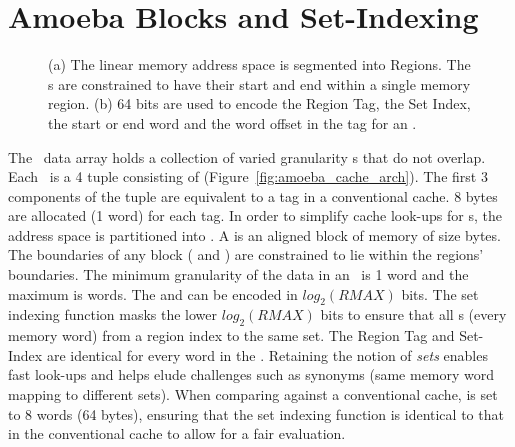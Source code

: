 \section{Amoeba Blocks and Set-Indexing}
\label{sec:amoeba_blocks_and_set_indexing}

\begin{figure}[h]
  \caption[Memory Regions]{ (a) The linear memory address space is segmented into Regions. The \AB{}s are constrained to have their start and end within a single memory region. (b) 64 bits are used to encode the Region Tag, the Set Index, the start or end word and the word offset in the tag for an \AB{}.  }
  \label{fig:mem_region_addr}
\end{figure}

The \AC\ data array holds a collection of varied granularity \AB{}s that do not overlap. Each \AB\ is a 4 tuple consisting of  (Figure~\ref{fig:amoeba_cache_arch}). The first 3 components of the tuple are equivalent to a tag in a conventional cache. 8 bytes are allocated (1 word) for each tag. In order to simplify cache look-ups for \AB{}s, the address space is partitioned into . A  is an aligned block of memory of size  bytes. The boundaries of any \AB{} block ( and ) are constrained to lie within the regions' boundaries. The minimum granularity of the data in an \AB\ is 1 word and the maximum is  words. The  and  can be encoded in $log_2(RMAX)$ bits. The set indexing function masks the lower $log_2(RMAX)$ bits to ensure that all \AB{}s (every memory word) from a region index to the same set. The Region Tag and Set-Index are identical for every word in the \AB{}. Retaining the notion of \textit{sets} enables fast look-ups and helps elude challenges such as synonyms (same memory word mapping to different sets). When comparing against a conventional cache,  is set to 8 words (64 bytes), ensuring that the set indexing function is identical to that in the conventional cache to allow for a fair evaluation.

